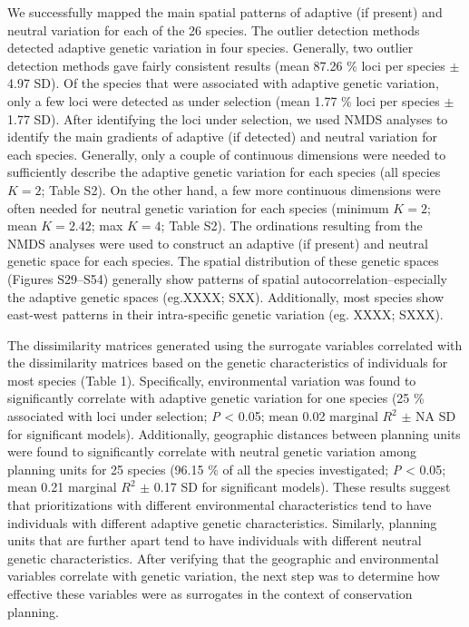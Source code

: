 \documentclass[11pt,]{article}
\begin{document}
We successfully mapped the main spatial patterns of adaptive (if
present) and neutral variation for each of the 26 species. The outlier
detection methods detected adaptive genetic variation in four species.
Generally, two outlier detection methods gave fairly consistent results
(mean 87.26 \% loci per species \(\pm\) 4.97 SD). Of the species that
were associated with adaptive genetic variation, only a few loci were
detected as under selection (mean 1.77 \% loci per species \(\pm\) 1.77
SD). After identifying the loci under selection, we used NMDS analyses
to identify the main gradients of adaptive (if detected) and neutral
variation for each species. Generally, only a couple of continuous
dimensions were needed to sufficiently describe the adaptive genetic
variation for each species (all species \(K = 2\); Table S2). On the
other hand, a few more continuous dimensions were often needed for
neutral genetic variation for each species (minimum \(K = 2\); mean
\(K = 2.42\); max \(K = 4\); Table S2). The ordinations resulting from
the NMDS analyses were used to construct an adaptive (if present) and
neutral genetic space for each species. The spatial distribution of
these genetic spaces (Figures S29--S54) generally show patterns of
spatial autocorrelation--especially the adaptive genetic spaces
(eg.XXXX; SXX). Additionally, most species show east-west patterns in
their intra-specific genetic variation (eg. XXXX; SXXX).

The dissimilarity matrices generated using the surrogate variables
correlated with the dissimilarity matrices based on the genetic
characteristics of individuals for most species (Table 1). Specifically,
environmental variation was found to significantly correlate with
adaptive genetic variation for one species (25 \% associated with loci
under selection; \emph{P} \textless{} 0.05; mean 0.02 marginal \(R^2\)
\(\pm\) NA SD for significant models). Additionally, geographic
distances between planning units were found to significantly correlate
with neutral genetic variation among planning units for 25 species
(96.15 \% of all the species investigated; \emph{P} \textless{} 0.05;
mean 0.21 marginal \(R^2\) \(\pm\) 0.17 SD for significant models).
These results suggest that prioritizations with different environmental
characteristics tend to have individuals with different adaptive genetic
characteristics. Similarly, planning units that are further apart tend
to have individuals with different neutral genetic characteristics.
After verifying that the geographic and environmental variables
correlate with genetic variation, the next step was to determine how
effective these variables were as surrogates in the context of
conservation planning.
\end{document}
